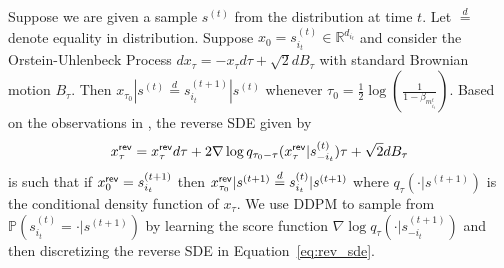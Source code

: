 Suppose we are given a sample $s^{(t)}$ from the distribution at time $t$. Let $\stackrel{d}{=}$ denote equality in distribution. Suppose $x_0 = s_{i_t}^{(t)} \in \mathbb{R}^{d_{i_t}}$ and consider the Orstein-Uhlenbeck Process $dx_\tau = -x_\tau d\tau + \sqrt{2}dB_\tau$ with standard Brownian motion $B_\tau$. Then $x_{\tau_0}|s^{(t)} \stackrel{d}{=} s_{i_t}^{(t+1)}|s^{(t)}$ whenever $\tau_0 = \frac{1}{2}\log(\tfrac{1}{1-\beta_{m_{i_t}^t}})$. Based on the observations in \cite{song2020score,ho2020denoising}, the reverse SDE given by 
\begin{equation}\label{eq:rev_sde}
    x_\tau^{\mathsf{rev}} = x_\tau^{\mathsf{rev}}d\tau + 2 \nabla \log q_{\tau_0-\tau}(x^{\mathsf{rev}}_{\tau}|s_{-i_t}^{(t)})\tau + \sqrt{2}dB_\tau
\end{equation} is such that if $x^{\mathsf{rev}}_0 = s_{i_t}^{(t+1)}$ then $x^{\mathsf{rev}}_{\tau_0}|s^{(t+1)} \stackrel{d}{=} s_{i_t}^{(t)}|s^{(t+1)}$ where
$q_{\tau}(\cdot|s^{(t+1)})$ is the conditional density function of $x_{\tau}$. We use DDPM \cite{ho2020denoising} to sample from $\mathbb{P}(s_{i_t}^{(t)} = \cdot|s^{(t+1)})$ by learning the score function $\nabla \log q_{\tau}(\cdot|s_{-i_t}^{(t+1)})$ and then discretizing the reverse SDE in Equation~\eqref{eq:rev_sde}.

